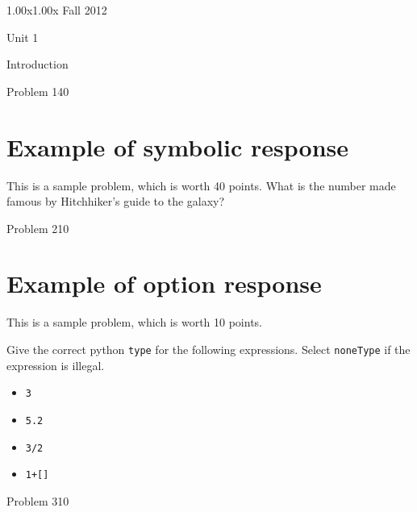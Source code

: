 \documentclass[12pt]{article}
\begin{document}
\begin{edXcourse}{1.00x}{1.00x Fall 2012}

\begin{edXchapter}{Unit 1}

\begin{edXsection}{Introduction}


\begin{edXproblem}{Problem 1}{40}

\section{Example of symbolic response}  
 
This is a sample problem, which is worth 40 points.  What is the number made famous by
Hitchhiker's guide to the galaxy?


\end{edXproblem}


\begin{edXproblem}{Problem 2}{10}

\section{Example of option response}  

This is a sample problem, which is worth 10 points.

Give the correct python {\tt type} for the following expressions.  Select {\tt noneType} if the expression is illegal.

\begin{itemize}
\item {\tt 3}   
\item {\tt 5.2} 
\item {\tt 3/2} 
\item {\tt 1+[]} 
\end{itemize}

\end{edXproblem}


\begin{edXproblem}{Problem 3}{10}


\end{edXproblem}
\end{edXsection}
\end{edXchapter}
\end{edXcourse}
\end{document}
